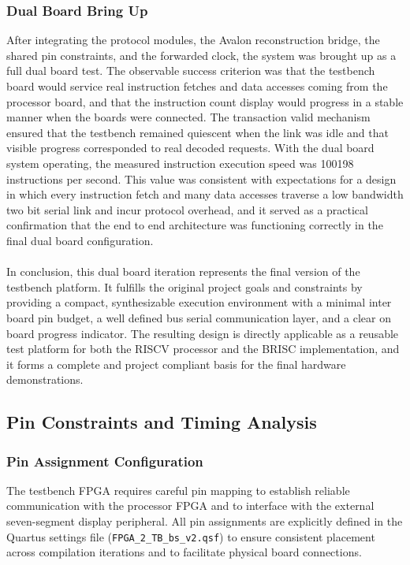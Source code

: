 \documentclass[12pt]{article}
\begin{document}
\subsubsection{Dual Board Bring Up}
After integrating the protocol modules, the Avalon reconstruction bridge, the shared pin constraints, and the forwarded clock, the system was brought up as a full dual board test. The observable success criterion was that the testbench board would service real instruction fetches and data accesses coming from the processor board, and that the instruction count display would progress in a stable manner when the boards were connected. The transaction valid mechanism ensured that the testbench remained quiescent when the link was idle and that visible progress corresponded to real decoded requests. With the dual board system operating, the measured instruction execution speed was 100198 instructions per second. This value was consistent with expectations for a design in which every instruction fetch and many data accesses traverse a low bandwidth two bit serial link and incur protocol overhead, and it served as a practical confirmation that the end to end architecture was functioning correctly in the final dual board configuration.
\\
\\
In conclusion, this dual board iteration represents the final version of the testbench platform. It fulfills the original project goals and constraints by providing a compact, synthesizable execution environment with a minimal inter board pin budget, a well defined bus serial communication layer, and a clear on board progress indicator. The resulting design is directly applicable as a reusable test platform for both the RISCV processor and the BRISC implementation, and it forms a complete and project compliant basis for the final hardware demonstrations.

\subsection{Pin Constraints and Timing Analysis}

\subsubsection{Pin Assignment Configuration}

The testbench FPGA requires careful pin mapping to establish reliable communication with the processor FPGA and to interface with the external seven-segment display peripheral. All pin assignments are explicitly defined in the Quartus settings file (\texttt{FPGA\_2\_TB\_bs\_v2.qsf}) to ensure consistent placement across compilation iterations and to facilitate physical board connections.
\end{document}
